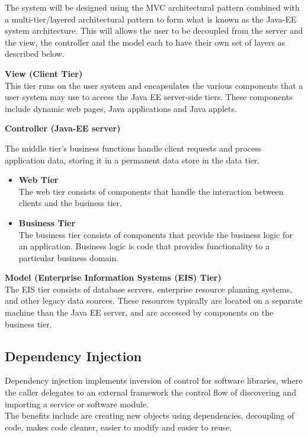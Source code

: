 \begin{flushleft}
The system will be designed using the MVC architectural pattern combined
with a multi-tier/layered architectural pattern to form what is known as the Java-EE system architecture.
This will allows the user to be decoupled from the server and the view, the controller and the model each 
to have their own set of layers as described below.

\textbf{View (Client Tier)}\\
This tier runs on the user system and encapsulates the various components that a user system may use to access the Java EE server-side tiers. These components include dynamic web pages, Java applications and Java applets. 

\textbf{Controller (Java-EE server)}

The middle tier's business functions handle client requests and process application data, storing it in a permanent data store in the data tier.

\begin{itemize}
	\item \textbf{Web Tier}
	\\The web tier consists of components that handle the interaction between clients and the business tier.
	
	\item \textbf{Business Tier}
	\\The business tier consists of components that provide the business logic for an application. Business logic is code that provides functionality to a particular business domain.
\end{itemize}

\textbf{Model (Enterprise Information Systems (EIS) Tier)}\\
The EIS tier consists of database servers, enterprise resource planning systems, and other legacy data sources. These resources typically are located on a separate machine than the Java EE server, and are accessed by components on the business tier.

\end{flushleft}

\subsection*{Dependency Injection}

\begin{flushleft}

Dependency injection implements inversion of control for software libraries, where the caller delegates to an external framework the control flow of discovering and importing a service or software module.\\
The benefits include are creating new objects using dependencies, decoupling of code, makes code cleaner, easier to modify and easier to reuse. 
\end{flushleft}


